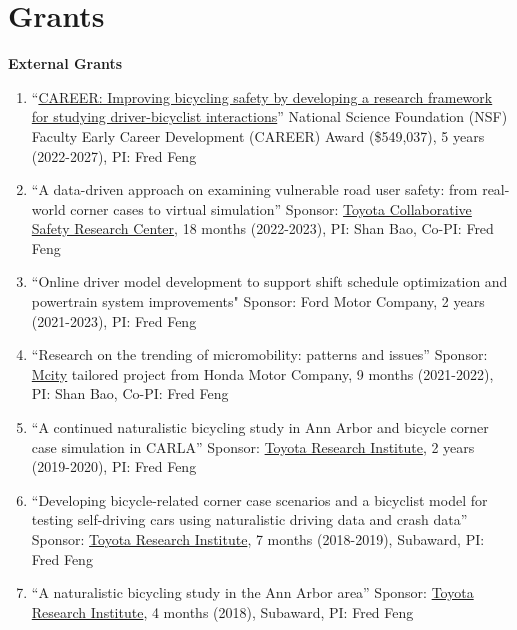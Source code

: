 \documentclass[11pt]{article}
\newenvironment{main}
{\begin{adjustwidth}{3em}{}}
{\end{adjustwidth}}
\begin{document}
\newpage

\section*{Grants}
\begin{main}


\textbf{External Grants}

\begin{enumerate}
    \item ``\href{https://www.nsf.gov/awardsearch/showAward?AWD_ID=2142757}{CAREER: Improving bicycling safety by developing a research framework for studying driver-bicyclist interactions}''
        National Science Foundation (NSF) Faculty Early Career Development (CAREER) Award (\$549,037), 5 years (2022-2027), PI: Fred Feng
    \item ``A data-driven approach on examining vulnerable road user safety: from real-world corner cases to virtual simulation'' 
         Sponsor: \href{https://amrd.toyota.com/division/csrc/}{Toyota Collaborative Safety Research Center}, 18 months (2022-2023), PI: Shan Bao, Co-PI: Fred Feng
    \item ``Online driver model development to support shift schedule optimization and powertrain system improvements"
        Sponsor: Ford Motor Company, 2 years (2021-2023), PI: Fred Feng
    \item ``Research on the trending of micromobility: patterns and issues''
        Sponsor: \href{https://mcity.umich.edu/}{Mcity} tailored project from Honda Motor Company, 9 months (2021-2022), PI: Shan Bao, Co-PI: Fred Feng
    \item ``A continued naturalistic bicycling study in Ann Arbor and bicycle corner case simulation in CARLA''
        Sponsor: \href{https://www.tri.global/}{Toyota Research Institute}, 2 years (2019-2020), PI: Fred Feng
    \item ``Developing bicycle-related corner case scenarios and a bicyclist model for testing self-driving cars using naturalistic driving data and crash data''
        Sponsor: \href{https://www.tri.global/}{Toyota Research Institute}, 7 months (2018-2019), Subaward, PI: Fred Feng
    \item ``A naturalistic bicycling study in the Ann Arbor area''
        Sponsor: \href{https://www.tri.global/}{Toyota Research Institute}, 4 months (2018), Subaward, PI: Fred Feng


\end{enumerate}
\end{main}
\end{document}
